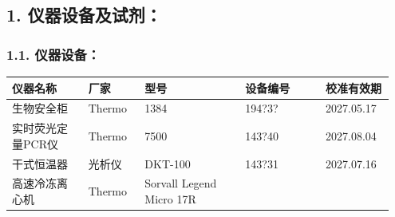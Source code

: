 \documentclass[UTF8,10pt,a4paper,fontset=fandol]{ctexart}
\newcommand{\fieldvalue}[1]{#1}
\newcommand{\handwritten}[1]{#1}
\begin{document}
\subsection*{1. 仪器设备及试剂：}

\subsubsection*{1.1. 仪器设备：}

\small
\begin{tabular}{|p{0.19\linewidth}|p{0.14\linewidth}|p{0.25\linewidth}|p{0.20\linewidth}|p{0.17\linewidth}|}
\hline
仪器名称 & 厂家 & 型号 & 设备编号 & 校准有效期\\
\hline
\fieldvalue{生物安全柜} &
\fieldvalue{Thermo} &
\fieldvalue{1384} &
\fieldvalue{\handwritten{194?3?}} &
\fieldvalue{\handwritten{2027.05.17}}\\
\hline
\fieldvalue{实时荧光定量PCR仪} &
\fieldvalue{Thermo} &
\fieldvalue{7500} &
\fieldvalue{\handwritten{143?40}} &
\fieldvalue{\handwritten{2027.08.04}}\\
\hline
\fieldvalue{干式恒温器} &
\fieldvalue{光析仪} &
\fieldvalue{DKT-100} &
\fieldvalue{\handwritten{143?31}} &
\fieldvalue{\handwritten{2027.07.16}}\\
\hline
\fieldvalue{高速冷冻离心机} &
\fieldvalue{Thermo} &
\fieldvalue{Sorvall Legend Micro 17R} &

\end{tabular}
\end{document}
